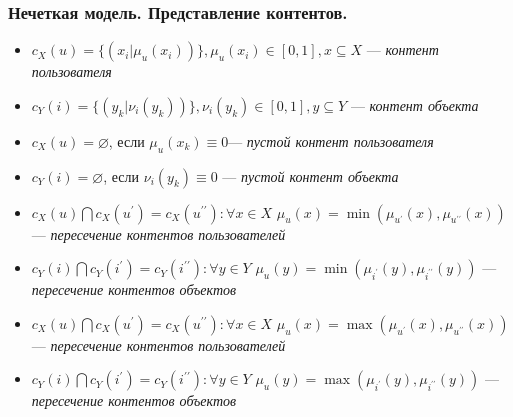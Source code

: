 \documentclass[10pt,xcolor={usenames,dvipsnames}]{beamer}
\theoremstyle{break}
\begin{document}
\begin{frame}
	\frametitle{Нечеткая модель. Представление контентов.}
  \begin{itemize}
	  \item $c_X(u) = \{(x_i | \mu_u(x_i )) \}, \mu_u(x_i) \in [0,1], x
		  \subseteq X$ --- {\it контент пользователя}
	  \item $c_Y(i) = \{(y_k | \nu_i(y_k )) \}, \nu_i(y_k) \in [0,1], y
		  \subseteq Y$ --- {\it контент объекта}
	  \item $c_X(u) = \varnothing$, если $\mu_u(x_k) \equiv 0$---
		  {\it пустой контент пользователя}
	  \item $c_Y(i) = \varnothing$, если $\nu_i(y_k) \equiv 0$ ---
		  {\it пустой контент объекта}
	  \item $c_X(u) \bigcap c_X(u^{\prime}) = c_X(u^{\prime \prime}):
		  \forall x \in X$ $\mu_u(x) =
	  \min(\mu_{u^{\prime}}(x), \mu_{ u^{\prime \prime}}(x))$ --- {\it пересечение контентов пользователей}
  \item $c_Y(i) \bigcap c_Y(i^{\prime}) = c_Y(i^{\prime \prime}): \forall y \in Y$ $\mu_u(y) =
	  \min(\mu_{i^{\prime}}(y), \mu_{ i^{\prime \prime}}(y))$ --- {\it
		  пересечение контентов объектов}
	  \item $c_X(u) \bigcap c_X(u^{\prime}) = c_X(u^{\prime \prime}): \forall x \in X$ $\mu_u(x) =
	  \max(\mu_{u^{\prime}}(x), \mu_{ u^{\prime \prime}}(x))$ --- {\it пересечение контентов пользователей}
  \item $c_Y(i) \bigcap c_Y(i^{\prime}) = c_Y(i^{\prime \prime}): \forall y \in Y$ $\mu_u(y) =
	  \max(\mu_{i^{\prime}}(y), \mu_{ i^{\prime \prime}}(y))$ --- {\it
		  пересечение контентов объектов}
  \end{itemize}
\end{frame}
\end{document}
